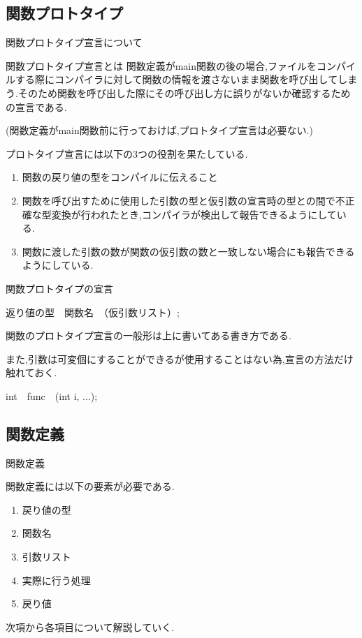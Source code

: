 \subsection{関数プロトタイプ}
\begin{frame}{関数プロトタイプ宣言について}
    \begin{block}{関数プロトタイプ宣言とは}
        関数定義がmain関数の後の場合,ファイルをコンパイルする際にコンパイラに対して関数の情報を渡さないまま関数を呼び出してしまう.そのため関数を呼び出した際にその呼び出し方に誤りがないか確認するための宣言である.

        (関数定義がmain関数前に行っておけば,プロトタイプ宣言は必要ない.)
    \end{block}
    プロトタイプ宣言には以下の3つの役割を果たしている.
    \begin{enumerate}
        \item 関数の戻り値の型をコンパイルに伝えること
        \item 関数を呼び出すために使用した引数の型と仮引数の宣言時の型との間で不正確な型変換が行われたとき,コンパイラが検出して報告できるようにしている.
        \item 関数に渡した引数の数が関数の仮引数の数と一致しない場合にも報告できるようにしている.
    \end{enumerate}
\end{frame}

\begin{frame}[fragile]{関数プロトタイプの宣言}
    \begin{block}{}
        返り値の型　関数名　（仮引数リスト）;        
    \end{block}
    
    関数のプロトタイプ宣言の一般形は上に書いてある書き方である.
    
    また,引数は可変個にすることができるが使用することはない為,宣言の方法だけ触れておく.
    \begin{block}{}
        int　func　(int i, ...);
    \end{block}
\end{frame}

\subsection{関数定義}
\begin{frame}[fragile]{関数定義}

関数定義には以下の要素が必要である.
\begin{enumerate}
    \item 戻り値の型
    \item 関数名
    \item 引数リスト
    \item 実際に行う処理
    \item 戻り値
\end{enumerate}
次項から各項目について解説していく.
\end{frame}


